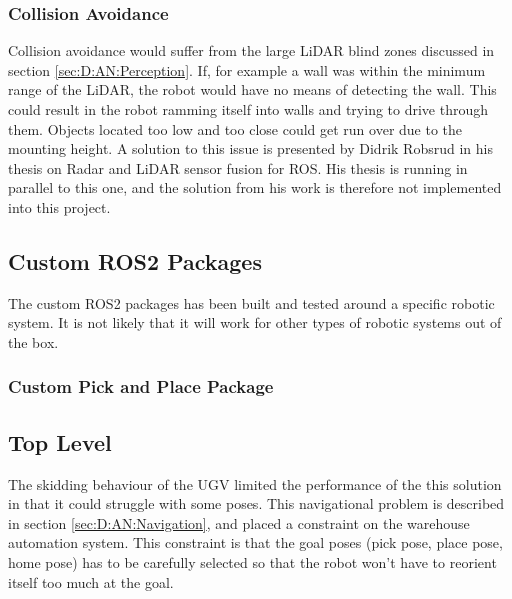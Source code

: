 \subsubsection{Collision Avoidance}
Collision avoidance would suffer from the large LiDAR blind zones discussed in section \ref{sec:D:AN:Perception}. If, for example a wall was within the minimum range of the LiDAR, the robot would have no means of detecting the wall. This could result in the robot ramming itself into walls and trying to drive through them. Objects located too low and too close could get run over due to the mounting height. A solution to this issue is presented by Didrik Robsrud in his thesis on Radar and LiDAR sensor fusion for ROS. His thesis is running in parallel to this one, and the solution from his work is therefore not implemented into this project.


\subsection{Custom ROS2 Packages}
The custom ROS2 packages has been built and tested around a specific robotic system. It is not likely that it will work for other types of robotic systems out of the box. 


\subsubsection{Custom Pick and Place Package}



\subsection{Top Level}
The skidding behaviour of the UGV limited the performance of the this solution in that it could struggle with some poses. This navigational problem is described in section \ref{sec:D:AN:Navigation}, and placed a constraint on the warehouse automation system. This constraint is that the goal poses (pick pose, place pose, home pose) has to be carefully selected so that the robot won't have to reorient itself too much at the goal. 

